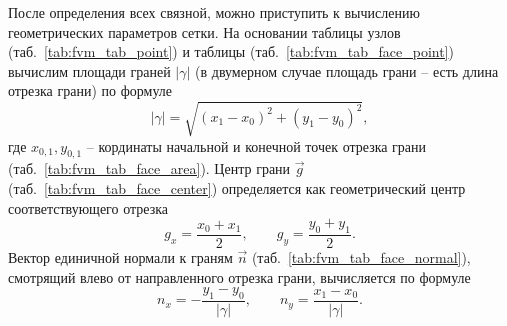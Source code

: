 После определения всех связной, можно приступить к вычислению геометрических
параметров сетки. На основании таблицы узлов (таб.~\ref{tab:fvm_tab_point}) и таблицы  (таб.~\ref{tab:fvm_tab_face_point})
вычислим площади граней $|\gamma|$ (в двумерном случае площадь грани -- есть длина отрезка грани)
по формуле
$$
|\gamma| = \sqrt{(x_1-x_0)^2 + (y_1 - y_0)^2},
$$
где $x_{0,1}, y_{0,1}$ -- кординаты начальной и конечной точек отрезка грани (таб.~\ref{tab:fvm_tab_face_area}).
Центр грани $\vec g$ (таб.~\ref{tab:fvm_tab_face_center}) определяется как геометрический центр соответствующего отрезка
$$
g_x = \frac{x_0 + x_1}2, \qquad g_y = \frac{y_0 + y_1}2.
$$
Вектор единичной нормали к граням $\vec n$ (таб.~\ref{tab:fvm_tab_face_normal}),
смотрящий влево от направленного отрезка грани, вычисляется по формуле
$$
n_x = -\frac{y_1 - y_0}{|\gamma|}, \qquad n_y = \frac{x_1 - x_0}{|\gamma|}.
$$

